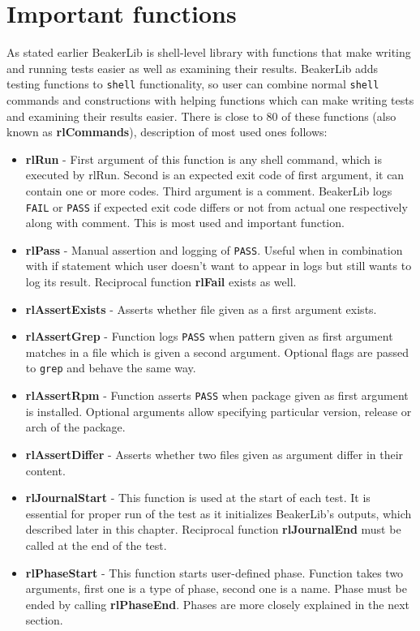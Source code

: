 \section{Important functions}
As stated earlier BeakerLib is shell-level library with functions that make writing and running tests easier as well as examining their results.
BeakerLib adds testing functions to \texttt{shell} functionality, so user can combine normal \texttt{shell} commands and constructions with helping functions which can make writing tests and examining their results easier. There is close to 80 of these functions (also known as \textbf{rlCommands}), description of most used ones follows:
\begin{itemize}
\item \textbf{rlRun} - First argument of this function is any shell command, which is executed by rlRun. Second is an expected exit code of first argument, it can contain one or more codes. Third argument is a comment. BeakerLib logs \texttt{FAIL} or \texttt{PASS} if expected exit code differs or not from actual one respectively along with comment. This is most used and important function.
\item \textbf{rlPass} - Manual assertion and logging of \texttt{PASS}. Useful when in combination with if statement which user doesn't want to appear in logs but still wants to log its result. Reciprocal function \textbf{rlFail} exists as well.
\item \textbf{rlAssertExists} - Asserts whether file given as a first argument exists.
\item \textbf{rlAssertGrep} - Function logs \texttt{PASS} when pattern given as first argument matches in a file which is given a second argument. Optional flags are passed to \texttt{grep} and behave the same way.
\item \textbf{rlAssertRpm} - Function asserts \texttt{PASS} when package given as first argument is installed.  Optional arguments allow specifying particular version, release or arch of the package.
\item \textbf{rlAssertDiffer} - Asserts whether two files given as argument differ in their content. 
\item \textbf{rlJournalStart} - This function is used at the start of each test. It is essential for proper run of the test as it initializes BeakerLib's  outputs, which described later in this chapter. Reciprocal function \textbf{rlJournalEnd} must be called at the end of the test.
\item \textbf{rlPhaseStart} - This function starts user-defined phase. Function takes two arguments, first one is a type of phase, second one is a name. Phase must be ended by calling \textbf{rlPhaseEnd}. Phases are more closely explained in the next section.
\end{itemize}

